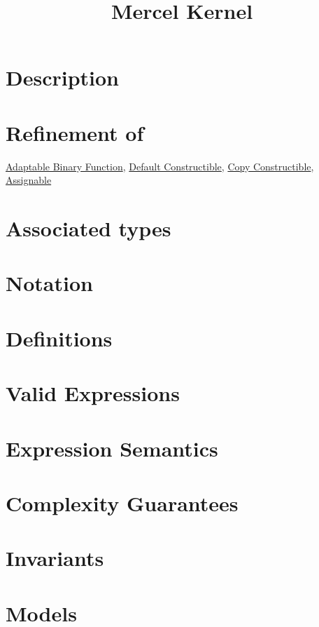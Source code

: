 \documentclass{article}
\begin{document}
\title{Mercel Kernel}
\maketitle


\section*{Description}
\section*{Refinement of}

\href{http://www.sgi.com/tech/stl/AdaptableBinaryFunction.html}{Adaptable Binary Function}, 
\href{http://www.sgi.com/tech/stl/DefaultConstructible.html}{Default Constructible}, 
\href{http://www.boost.org/doc/html/CopyConstructible.html}{Copy Constructible},
\href{http://www.sgi.com/tech/stl/Assignable.html}{Assignable}

\section*{Associated types}

\section*{Notation}
\section*{Definitions}
\section*{Valid Expressions}
\section*{Expression Semantics}

\section*{Complexity Guarantees}

\section*{Invariants}

\section*{Models}
\end{document}
